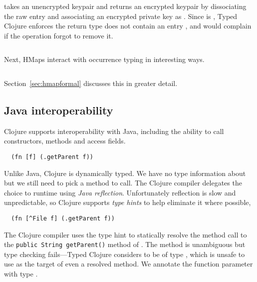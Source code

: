 \begin{exmp}
\inputminted[firstline=10,lastline=22]{clojure}{code/demo/src/demo/key.clj}
\end{exmp}

 takes an unencrypted keypair and returns an encrypted keypair by
dissociating the raw  entry and associating an encrypted private key
as .
Since  is , Typed Clojure enforces the return type
does not contain an entry , and would complain if the 
operation forgot to remove it.

\begin{exmp}
\inputminted[firstline=10,lastline=21]{clojure}{code/demo/src/demo/key2.clj}
\end{exmp}

Next, 
HMaps interact with occurrence typing in interesting ways.

\begin{exmp}
\inputminted[firstline=15,lastline=27]{clojure}{code/demo/src/demo/hmap.clj}
\end{exmp}

Section~\ref{sec:hmapformal} discusses this in greater detail.

\subsection{Java interoperability}
\label{sec:overviewjavainterop}

Clojure supports interoperability with Java, including the ability to
call constructors, methods and access fields.

\begin{verbatim}
  (fn [f] (.getParent f))
\end{verbatim}

Unlike Java, Clojure is dynamically typed. We have no type information about 
but we still need to pick a method to call. The Clojure compiler delegates
the choice to runtime using \emph{Java reflection}.
Unfortunately reflection is slow and unpredictable, so Clojure supports \emph{type hints}
to help eliminate it where possible, 

\begin{verbatim}
  (fn [^File f] (.getParent f))
\end{verbatim}

The Clojure compiler uses the type hint
to statically resolve 
the method call to the
\texttt{public String getParent()}
method of .
The method is unambiguous but type checking fails---Typed Clojure
considers  to be of type , which is unsafe 
to use as the target of even a resolved method.
We annotate the function parameter with type .

